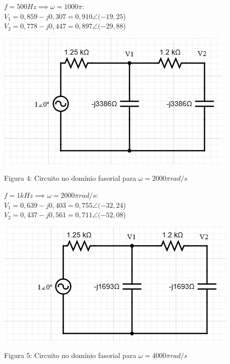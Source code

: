 \documentclass[a4 paper]{article}
\begin{document}
$f=500Hz\implies \omega = 1000\pi:$\\\centering
$V_1=0,859-j0,307 = 0,910\angle(-19,25$\textdegree)\\
$V_2=0,778-j0,447=0,897\angle(-29,88$\textdegree)\\
\justifying

\begin{table}[h]
\centering
\includegraphics[scale=0.6]{figuras/figura4}
\end{table}

\begin{center}
Figura 4: Circuito no domínio fasorial para $\omega=2000\pi rad/s$
\end{center}

$f=1kHz\implies \omega = 2000\pi rad/s:$\\\centering
$V_1=0,639-j0,403=0,755\angle(-32,24$\textdegree)\\
$V_2=0,437-j0,561=0,711\angle(-52,08$\textdegree)\\
\justifying

\begin{table}[h]
\centering
\includegraphics[scale=0.6]{figuras/figura5}
\end{table}

\begin{center}
Figura 5: Circuito no domínio fasorial para $\omega=4000\pi rad/s$
\end{center}
\end{document}
